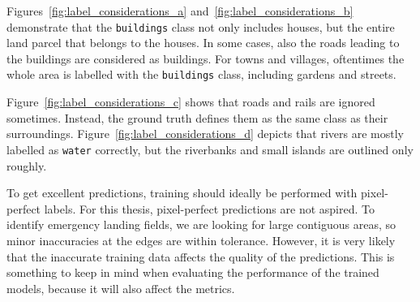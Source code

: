 Figures~\ref{fig:label_considerations_a} and~\ref{fig:label_considerations_b} demonstrate that the \texttt{buildings} class not only includes houses, but the entire land parcel that belongs to the houses. In some cases, also the roads leading to the buildings are considered as buildings. For towns and villages, oftentimes the whole area is labelled with the \texttt{buildings} class, including gardens and streets.

Figure~\ref{fig:label_considerations_c} shows that roads and rails are ignored sometimes. Instead, the ground truth defines them as the same class as their surroundings. Figure~\ref{fig:label_considerations_d} depicts that rivers are mostly labelled as \texttt{water} correctly, but the riverbanks and small islands are outlined only roughly.

To get excellent predictions, training should ideally be performed with pixel-perfect labels. For this thesis, pixel-perfect predictions are not aspired. To identify emergency landing fields, we are looking for large contiguous areas, so minor inaccuracies at the edges are within tolerance. However, it is very likely that the inaccurate training data affects the quality of the predictions. This is something to keep in mind when evaluating the performance of the trained models, because it will also affect the metrics.

\clearpage
